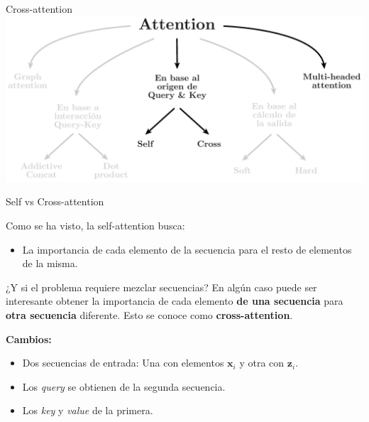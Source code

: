 \documentclass[aspectratio=169]{beamer}
\begin{document}
\begin{frame}{Cross-attention}
  \includegraphics[width=.85\textwidth, center]{imgs/tema4/att/AttOutline cross.pdf}
\end{frame}


\begin{frame}{Self vs Cross-attention}
  
  Como se ha visto, la self-attention busca:
  \begin{itemize}
    \item La importancia de cada elemento de la secuencia para el resto de elementos de la misma.
  \end{itemize}
  \vspace{.3cm}
  \begin{block}{¿Y si el problema requiere mezclar secuencias?}
    En algún caso puede ser interesante obtener la importancia de cada elemento \textbf{de una secuencia} para \textbf{otra secuencia} diferente. Esto se conoce como \textbf{cross-attention}.
  \end{block}
  \vspace{.3cm}
  \textbf{Cambios:}
  \begin{itemize}
    \item Dos secuencias de entrada:  Una con elementos $\mathbf{x}_{i}$ y otra con $\mathbf{z}_{i}$. 
    \item Los \emph{query} se obtienen de la segunda secuencia. 
    \item Los \emph{key} y \emph{value} de la primera.
  \end{itemize}

\end{frame}
\end{document}

